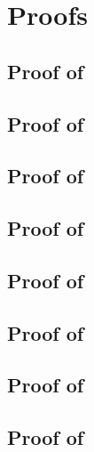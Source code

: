 \section{Proofs}
\label{app:proofs}

\subsection{Proof of }
\label{sec:proof-eh}


\subsection{Proof of }
\label{sec:proof-stat}


\subsection{Proof of }
\label{sec:proof-leg-cte}


\subsection{Proof of }
\label{sec:proof-leg-hte}


\subsection{Proof of }
\label{sec:proof-tlr}


\subsection{Proof of }
\label{sec:proof-tlr-lim}


\subsection{Proof of }
\label{sec:proof-bc}


\subsection{Proof of }
\label{sec:proof-tlr-lfc}


